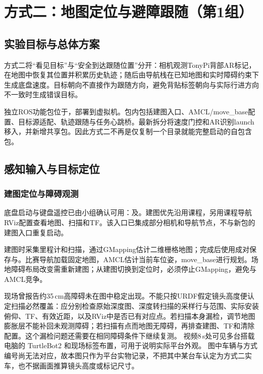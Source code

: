 \section{方式二：地图定位与避障跟随（第1组）}
\subsection{实验目标与总体方案}
方式二将“看见目标”与“安全到达跟随位置”分开：相机观测TonyPi背部AR标记，在地图中恢复其位置并积累历史轨迹；随后由导航栈在已知地图和实时障碍约束下生成底盘速度。目标朝向不直接作为跟随方向，避免背贴标签朝向与实际行进方向不一致时生成错误目标。

独立ROS功能包位于，部署到虚拟机。包内包括建图入口、AMCL/move\_base配置、目标源适配、轨迹跟随与任务心跳桥。最新拆分将速度门控和AR识别launch移入，并新增共享包。因此方式二不再是仅复制一个目录就能完整启动的自包含包。

\subsection{感知输入与目标定位}
\subsubsection{建图定位与障碍观测}
底盘启动与键盘遥控已由小组确认可用：及。建图优先沿用课程，另用课程导航RViz配置查看地图、扫描和TF。该入口已集成部分相机和导航节点，不与新包的建图入口重复启动。

建图时采集里程计和扫描，通过GMapping估计二维栅格地图；完成后使用成对保存与。比赛导航加载固定地图，AMCL估计当前车位姿，move\_base进行规划。场地障碍布局改变需重新建图；从建图切换到定位时，必须停止GMapping，避免与AMCL竞争。

现场曾报告约35\,cm高障碍未在图中稳定出现。不能只按URDF假定镜头高度便认定扫描必然覆盖：应分别检查原始深度图、深度转扫描的采样行与范围、实际安装俯仰、TF、有效近距，以及RViz中是否已有对应点。若扫描本身漏检，调节地图膨胀层不能补回未观测障碍；若扫描有点而地图无障碍，再排查建图、TF和清除配置。这个漏检问题还需要在相同障碍条件下继续复测。
视频8\,s处可见多台搭载电脑的 TurtleBot2 和现场标签布置，可用于说明实际平台外观。
图中车辆与方式编号尚无法对应，故本图只作为平台实物记录，不把其中某台车认定为方式二实车，也不据画面推算镜头高度或标记尺寸。
